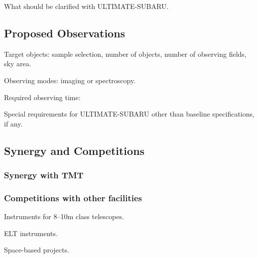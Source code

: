 What should be clarified with ULTIMATE-SUBARU.

\subsection{Proposed Observations}

Target objects: sample selection, number of objects, number of observing
fields, sky area.

Observing modes: imaging or spectroscopy.

Required observing time:

Special requirements for ULTIMATE-SUBARU other than baseline
specifications, if any.

\subsection{Synergy and Competitions}

\subsubsection{Synergy with TMT}

\subsubsection{Competitions with other facilities}

Instruments for 8--10m class telescopes.

ELT instruments.

Space-based projects.



